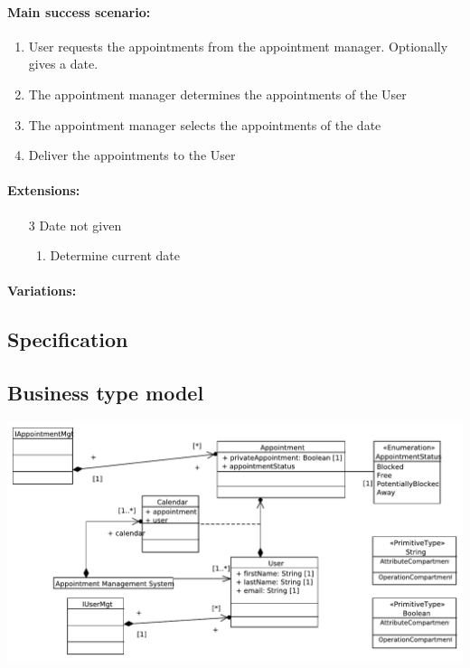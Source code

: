 \documentclass[a4paper]{scrartcl}
\begin{document}
\paragraph{Main success scenario:}
\begin{enumerate}
	\item User requests the appointments from the appointment manager. Optionally gives a date.
	\item The appointment manager determines the appointments of the User
	\item The appointment manager selects the appointments of the date
	\item Deliver the appointments to the User 
\end{enumerate}

\paragraph{Extensions:}
\begin{enumerate}
	\item[3] Date not given
		\begin{enumerate}
			\item Determine current date
		\end{enumerate}
\end{enumerate}


\paragraph{Variations:}

\begin{landscape}
\section{Specification}
\subsection{Business type model}
\includegraphics{pictures/BusinessTypeModel}
\end{landscape}
\end{document}
